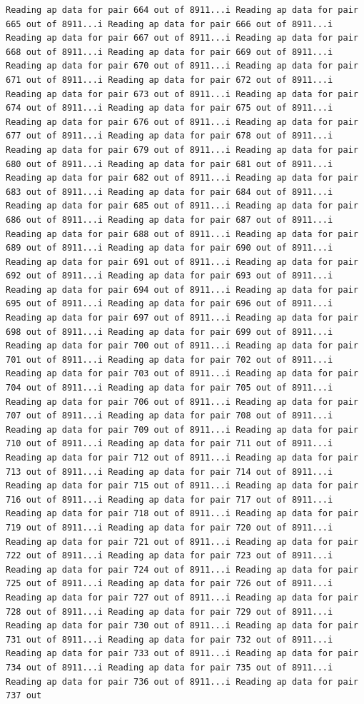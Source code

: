 \documentclass[
]{article}
\begin{document}
\begin{verbatim}
Reading ap data for pair 664 out of 8911...i Reading ap data for pair 665 out of 8911...i Reading ap data for pair 666 out of 8911...i Reading ap data for pair 667 out of 8911...i Reading ap data for pair 668 out of 8911...i Reading ap data for pair 669 out of 8911...i Reading ap data for pair 670 out of 8911...i Reading ap data for pair 671 out of 8911...i Reading ap data for pair 672 out of 8911...i Reading ap data for pair 673 out of 8911...i Reading ap data for pair 674 out of 8911...i Reading ap data for pair 675 out of 8911...i Reading ap data for pair 676 out of 8911...i Reading ap data for pair 677 out of 8911...i Reading ap data for pair 678 out of 8911...i Reading ap data for pair 679 out of 8911...i Reading ap data for pair 680 out of 8911...i Reading ap data for pair 681 out of 8911...i Reading ap data for pair 682 out of 8911...i Reading ap data for pair 683 out of 8911...i Reading ap data for pair 684 out of 8911...i Reading ap data for pair 685 out of 8911...i Reading ap data for pair 686 out of 8911...i Reading ap data for pair 687 out of 8911...i Reading ap data for pair 688 out of 8911...i Reading ap data for pair 689 out of 8911...i Reading ap data for pair 690 out of 8911...i Reading ap data for pair 691 out of 8911...i Reading ap data for pair 692 out of 8911...i Reading ap data for pair 693 out of 8911...i Reading ap data for pair 694 out of 8911...i Reading ap data for pair 695 out of 8911...i Reading ap data for pair 696 out of 8911...i Reading ap data for pair 697 out of 8911...i Reading ap data for pair 698 out of 8911...i Reading ap data for pair 699 out of 8911...i Reading ap data for pair 700 out of 8911...i Reading ap data for pair 701 out of 8911...i Reading ap data for pair 702 out of 8911...i Reading ap data for pair 703 out of 8911...i Reading ap data for pair 704 out of 8911...i Reading ap data for pair 705 out of 8911...i Reading ap data for pair 706 out of 8911...i Reading ap data for pair 707 out of 8911...i Reading ap data for pair 708 out of 8911...i Reading ap data for pair 709 out of 8911...i Reading ap data for pair 710 out of 8911...i Reading ap data for pair 711 out of 8911...i Reading ap data for pair 712 out of 8911...i Reading ap data for pair 713 out of 8911...i Reading ap data for pair 714 out of 8911...i Reading ap data for pair 715 out of 8911...i Reading ap data for pair 716 out of 8911...i Reading ap data for pair 717 out of 8911...i Reading ap data for pair 718 out of 8911...i Reading ap data for pair 719 out of 8911...i Reading ap data for pair 720 out of 8911...i Reading ap data for pair 721 out of 8911...i Reading ap data for pair 722 out of 8911...i Reading ap data for pair 723 out of 8911...i Reading ap data for pair 724 out of 8911...i Reading ap data for pair 725 out of 8911...i Reading ap data for pair 726 out of 8911...i Reading ap data for pair 727 out of 8911...i Reading ap data for pair 728 out of 8911...i Reading ap data for pair 729 out of 8911...i Reading ap data for pair 730 out of 8911...i Reading ap data for pair 731 out of 8911...i Reading ap data for pair 732 out of 8911...i Reading ap data for pair 733 out of 8911...i Reading ap data for pair 734 out of 8911...i Reading ap data for pair 735 out of 8911...i Reading ap data for pair 736 out of 8911...i Reading ap data for pair 737 out 
\end{verbatim}
\end{document}
